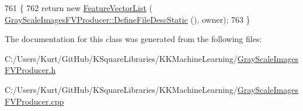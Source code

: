 \begin{DoxyCode}
761 \{
762   \textcolor{keywordflow}{return} \textcolor{keyword}{new} \hyperlink{class_k_k_m_l_l_1_1_feature_vector_list}{FeatureVectorList} (
      \hyperlink{class_k_k_m_l_l_1_1_gray_scale_images_f_v_producer_a077006af32da9856f20e77fd32898624}{GrayScaleImagesFVProducer::DefineFileDescStatic} (), owner);
763 \}
\end{DoxyCode}


The documentation for this class was generated from the following files\+:\begin{DoxyCompactItemize}
\item 
C\+:/\+Users/\+Kurt/\+Git\+Hub/\+K\+Square\+Libraries/\+K\+K\+Machine\+Learning/\hyperlink{_gray_scale_images_f_v_producer_8h}{Gray\+Scale\+Images\+F\+V\+Producer.\+h}\item 
C\+:/\+Users/\+Kurt/\+Git\+Hub/\+K\+Square\+Libraries/\+K\+K\+Machine\+Learning/\hyperlink{_gray_scale_images_f_v_producer_8cpp}{Gray\+Scale\+Images\+F\+V\+Producer.\+cpp}\end{DoxyCompactItemize}
